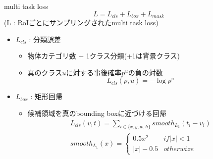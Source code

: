 \documentclass[aspectratio=169, dvipdfmx, 11pt]{beamer}
\begin{document}
\begin{frame}{multi task loss}
    \begin{equation*}
        L = L_{cls} + L_{box} + L_{mask}
    \end{equation*}
    \centering
    (L : RoIごとにサンプリングされたmulti task loss)
    \begin{itemize}
        \item $L_{cls}$ : 分類誤差
        \begin{itemize}
            \item 物体カテゴリ数 + 1クラス分類(+1は背景クラス) \\
            \item 真のクラス$u$に対する事後確率$p^u$の負の対数 \\
            \begin{equation*}
                L_{cls}(p, u) = - \log p^u
            \end{equation*}
        \end{itemize}
        \item $L_{box}$ : 矩形回帰
        \begin{itemize}
            \item 候補領域を真のbounding boxに近づける回帰 \\
            \begin{eqnarray*}
                L_{cls}(v, t) = \sum_{i \in \{x, y, w, h\}} smooth_{L_1}(t_i - v_i) \\
                smooth_{L_1}(x) = \begin{cases}
                    0.5x^2 & if |x| < 1 \\
                    |x| - 0.5 & otherwize
                  \end{cases}
            \end{eqnarray*}
        \end{itemize}
    \end{itemize}
\end{frame}
\end{document}
